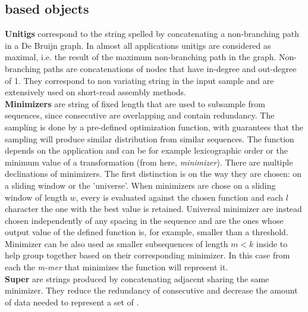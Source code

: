 \subsection{\kmer based objects}
\label{sec:kmerobjects}
\textbf{Unitigs} correspond to the string spelled by concatenating a non-branching path in a De Bruijn graph. In almost all applications unitigs are considered as maximal, i.e. the result of the maximum non-branching path in the graph. Non-branching paths are concatenations of nodes that have in-degree and out-degree of 1. They correspond to non variating string in the input sample and are extensively used on short-read assembly methods.\\
\textbf{Minimizers} are string of fixed length that are used to subsample \kmers from sequences, since consecutive \kmers are overlapping and contain redundancy. The sampling is done by a pre-defined optimization function, with guarantees that the sampling will produce similar distribution from similar sequences. The function depends on the application and can be for example lexicographic order or the minimum value of a transformation (from here, \emph{minimizer}). There are multiple declinations of minimizers. The first distinction is on the way they are chosen: on a sliding window or the 'universe'. When minimizers are chose on a sliding window of length $w$, every \kmer is evaluated against the chosen function and each $l$ character the one with the best value is retained. Universal minimizer are instead chosen independently of any spacing in the sequence and are the ones whose output value of the defined function is, for example, smaller than a threshold. \\
Minimizer can be also used as smaller subsequences of length $m < k$ inside \kmers to help group together \kmers based on their corresponding minimizer. In this case from each \kmer the \emph{m-mer} that minimizes the function will represent it. \\
\textbf{Super\kmers} are strings produced by concatenating adjacent \kmers sharing the same minimizer. They reduce the redundancy of consecutive \kmers and decrease the amount of data needed to represent a set of \kmers. 
